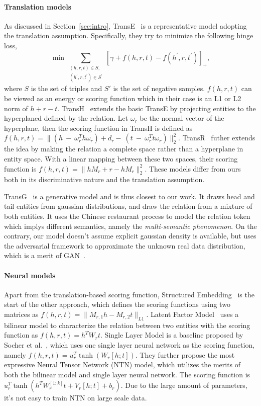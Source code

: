 \documentclass[twocolumn,a4paper,preprint,10pt,3p]{elsarticle}
\begin{document}
\paragraph{Translation models} As discussed in Section~\ref{sec:intro}, TransE~\cite{TransE2013} is a representative model adopting the translation assumption. Specifically, they try to minimize the following hinge loss,
\begin{equation}
    \min\sum_{\substack{(h, r, t)\in S,\\ (h^\prime, r, t^\prime)\in S^\prime }}
        {\left[\gamma + f(h, r, t) - f(h^\prime, r, t^\prime)\right]}_+, \label{eq:TransE}
\end{equation}
where $S$ is the set of triples and $S'$ is the set of negative samples. $f(h, r, t)$ can be viewed as an energy or scoring function which in their case is an L1 or L2 norm of $h + r - t$. TransH~\cite{TransH2014} extends the basic TransE by projecting entities to the hyperplaned defined by the relation. Let $\omega_r$ be the normal vector of the hyperplane, then the scoring function in TransH is defined as $f(h, r, t) = \lVert(h~-~\omega_r^T h \omega_r) + d_r -~(t~-~\omega_r^T t \omega_r)\rVert_2^2 $.
TransR~\cite{TransR2015} futher extends the idea by making the relation a complete space rather than a hyperplane in entity space. With a linear mapping between these two spaces, their scoring function is $f(h, r, t) = \lVert hM_r + r - h M_r \rVert_2^2$. These models differ from ours both in its discriminative nature and the translation assumption.

TransG~\cite{TransG} is a generative model and is thus closest to our work. It draws head and tail entities from gaussian distributions, and draw the relation from a mixture of both entities. It uses the Chinese restaurant process to model the relation token which implys different semantics, namely the \emph{multi-semantic phenomenon}.
On the contrary, our model doesn't assume explicit gaussian density is available, but uses the adversarial framework to approximate the unknown real data distribution, which is a merit of GAN~\cite{Goodfellow_2016}.

\paragraph{Neural models} Apart from the translation-based scoring function, Structured Embedding~\cite{bordes2011structured_embedding} is the start of the other approach, which defines the scoring functions using two matrices as $f(h, r, t) = \lVert M_{r,1}h - M_{r,2}t \rVert_{L1}$. Latent Factor Model~\cite{jenatton2012bilinear} uses a bilinear model to characterize the relation between two entities with the scoring function as $f(h, r, t) = h^T W_r t$.
Single Layer Model is a baseline proposed by Socher et al.~\cite{NTN}, which uses one single layer neural network as the scoring function, namely $f(h, r, t)=u_r^T \tanh(W_r[h;t])$. They further propose the most expressive Neural Tensor Network (NTN) model, which utilizes the merits of both the bilinear model and single layer neural network. The scoring function is $u_r^T \tanh(h^T W_r^{[1:k]}t + V_r[h;t] + b_r)$. Due to the large amount of parameters, it's not easy to train NTN on large scale data.
\end{document}
